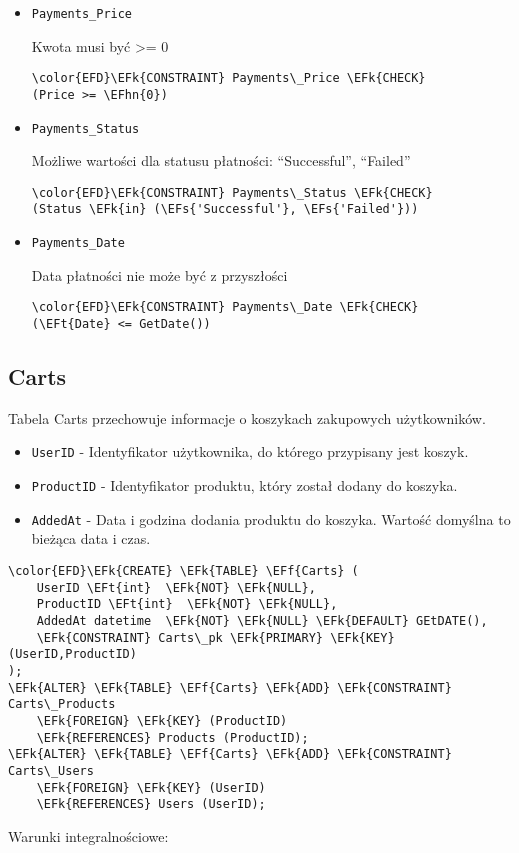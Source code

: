 \documentclass[11pt]{article}
\newcommand{\EFs}[1]{\textcolor{EFs}{#1}} %
\newcommand{\EFk}[1]{\textcolor{EFk}{\textbf{#1}}} %
\newcommand{\EFf}[1]{\textcolor{EFf}{#1}} %
\newcommand{\EFt}[1]{\textcolor{EFt}{\textbf{#1}}} %
\newcommand{\EFhn}[1]{\textcolor{EFhn}{#1}} %
\begin{document}
\begin{itemize}
\item \texttt{Payments\_Price}

Kwota musi być  >= 0
\begin{Code}
\begin{Verbatim}
\color{EFD}\EFk{CONSTRAINT} Payments\_Price \EFk{CHECK}
(Price >= \EFhn{0})
\end{Verbatim}
\end{Code}
\item \texttt{Payments\_Status}

Możliwe wartości dla statusu płatności: ``Successful'', ``Failed''
\begin{Code}
\begin{Verbatim}
\color{EFD}\EFk{CONSTRAINT} Payments\_Status \EFk{CHECK}
(Status \EFk{in} (\EFs{'Successful'}, \EFs{'Failed'}))
\end{Verbatim}
\end{Code}
\item \texttt{Payments\_Date}

Data płatności nie może być z przyszłości
\begin{Code}
\begin{Verbatim}
\color{EFD}\EFk{CONSTRAINT} Payments\_Date \EFk{CHECK}
(\EFt{Date} <= GetDate())
\end{Verbatim}
\end{Code}
\end{itemize}
\subsection{Carts}
\label{sec:orgfc6a64a}
Tabela Carts przechowuje informacje o koszykach zakupowych użytkowników.
\begin{itemize}
\item \texttt{UserID} - Identyfikator użytkownika, do którego przypisany jest koszyk.
\item \texttt{ProductID} - Identyfikator produktu, który został dodany do koszyka.
\item \texttt{AddedAt} - Data i godzina dodania produktu do koszyka. Wartość domyślna to bieżąca data i czas.
\end{itemize}
\begin{Code}
\begin{Verbatim}
\color{EFD}\EFk{CREATE} \EFk{TABLE} \EFf{Carts} (
    UserID \EFt{int}  \EFk{NOT} \EFk{NULL},
    ProductID \EFt{int}  \EFk{NOT} \EFk{NULL},
    AddedAt datetime  \EFk{NOT} \EFk{NULL} \EFk{DEFAULT} GEtDATE(),
    \EFk{CONSTRAINT} Carts\_pk \EFk{PRIMARY} \EFk{KEY}  (UserID,ProductID)
);
\EFk{ALTER} \EFk{TABLE} \EFf{Carts} \EFk{ADD} \EFk{CONSTRAINT} Carts\_Products
    \EFk{FOREIGN} \EFk{KEY} (ProductID)
    \EFk{REFERENCES} Products (ProductID);
\EFk{ALTER} \EFk{TABLE} \EFf{Carts} \EFk{ADD} \EFk{CONSTRAINT} Carts\_Users
    \EFk{FOREIGN} \EFk{KEY} (UserID)
    \EFk{REFERENCES} Users (UserID);
\end{Verbatim}
\end{Code}
Warunki integralnościowe:
\end{document}
